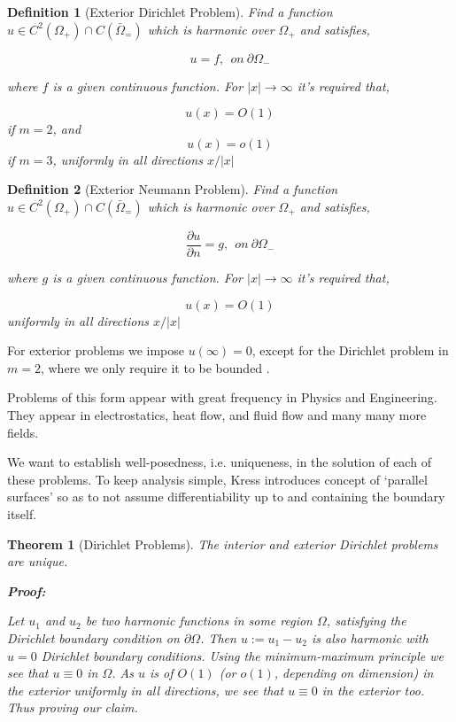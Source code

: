 \documentclass[12pt, a4, twoside]{article}
\newtheorem{theorem}{Theorem}[section]
\newtheorem{definition}{Definition}[section]
\begin{document}
\begin{definition}[Exterior Dirichlet Problem]
    \label{def:ext_dir_prob}
    Find a function $u \in C^2(\Omega_+) \cap C(\bar{\Omega}_=)$ which is harmonic over $\Omega_+$ and satisfies,

    $$ u = f, \> \> on \> \partial \Omega_- $$ 

    where $f$ is a given continuous function. For $|x| \rightarrow \infty$ it's required that,

    $$u(x) = O(1)$$ if $m=2$, and $$u(x)=o(1)$$ if $m=3$, uniformly in all directions $x/|x|$
\end{definition}

\begin{definition}[Exterior Neumann Problem]
    \label{def:ext_neu_prob}
    Find a function $u \in C^2(\Omega_+) \cap C(\bar{\Omega}_=)$ which is harmonic over $\Omega_+$ and satisfies,

    $$ \frac{\partial u}{\partial n} = g, \> \> on \>  \partial \Omega_- $$ 

    where $g$ is a given continuous function. For $|x| \rightarrow \infty$ it's required that,

    $$u(x) = O(1)$$ uniformly in all directions $x/|x|$
\end{definition}

For exterior problems we impose $u(\infty) = 0$, except for the Dirichlet problem in $m=2$, where we only require it to be bounded \cite*[]{kress2012}.


Problems of this form appear with great frequency in Physics and Engineering. They appear in electrostatics, heat flow, and fluid flow and many many more fields.

We want to establish well-posedness, i.e. uniqueness, in the solution of each of these problems. To keep analysis simple, Kress \cite*[]{kress2012} introduces concept of `parallel surfaces' so as to not assume differentiability up to and containing the boundary itself.

\begin{theorem}[Dirichlet Problems]
    The interior and exterior Dirichlet problems are unique.

    \textbf{Proof:}

    Let $u_1$ and $u_2$ be two harmonic functions in some region $\Omega$, satisfying the Dirichlet boundary condition on $\partial \Omega$. Then $u := u_1 - u_2$ is also harmonic with $u = 0$ Dirichlet boundary conditions. Using the minimum-maximum principle we see that $u \equiv 0$ in $\Omega$. As $u$ is of $O(1)$ (or $o(1)$, depending on dimension) in the exterior uniformly in all directions, we see that $u \equiv 0$ in the exterior too. Thus proving our claim.
\end{theorem}
\end{document}

